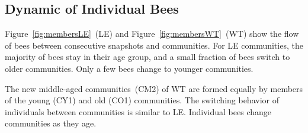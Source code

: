 


\subsection{Dynamic of Individual Bees}
Figure~\ref{fig:membersLE}~(LE) and Figure~\ref{fig:membersWT}~(WT) show the flow of bees between consecutive snapshots and communities.
For LE communities, the majority of bees stay in their age group, and a small fraction of bees switch to older communities.
Only a few bees change to younger communities.

The new middle-aged communities~(CM2) of WT are formed equally by members of the young (CY1) and old (CO1) communities. The switching behavior of individuals between communities is similar to LE.
Individual bees change communities as they age.


